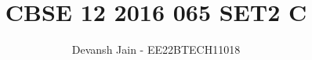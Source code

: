 \documentclass[12pt,-letter paper]{article}
\begin{document}
%

\title{CBSE 12 2016 065 SET2 C}
\author{Devansh Jain - EE22BTECH11018}
	
	


%
%
%

% 
%



% 
\end{document}
